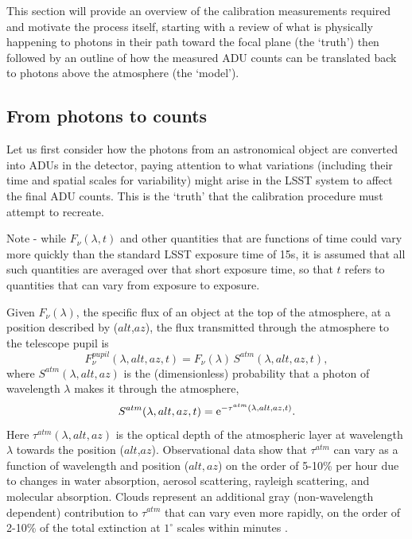 \documentclass[12pt,preprint]{aastex}
\begin{document}
This section will provide an overview of the calibration measurements
required and motivate the process itself, starting with a review of
what is physically happening to photons in their path toward the focal
plane (the `truth') then followed by an outline of how the measured
ADU counts can be translated back to photons above the atmosphere (the
`model').

\subsection{From photons to counts}

Let us first consider how the photons from an astronomical object are
converted into ADUs in the detector, paying attention to what
variations (including their time and spatial scales for variability)
might arise in the LSST system to affect the final ADU counts. This is
the `truth' that the calibration procedure must attempt to recreate. 

Note - while $F_\nu(\lambda,t)$ and other quantities that are functions of time
could vary more quickly than the standard LSST exposure time of 15s, it is
assumed that all such quantities are averaged over that short exposure time, so 
that $t$ refers to quantities that can vary from exposure to exposure. 

Given $F_\nu(\lambda)$, the specific flux of an object at
the top of the atmosphere, at a position described by ($alt$,$az$),
the flux transmitted through the atmosphere to the telescope pupil is
\begin{equation}
\label{eqn:Fpupil}
   F_\nu^{pupil}(\lambda,alt,az,t) = F_\nu(\lambda) \, S^{atm}(\lambda,alt,az,t),
\end{equation}
where $S^{atm}(\lambda,alt,az)$ is the (dimensionless) probability that a photon of 
wavelength $\lambda$ makes it through the atmosphere,
\begin{equation}
\label{eqn:atmTau}
   S^{atm}(\lambda,alt,az,t)   = {\rm e}^{-\tau^{atm}(\lambda,alt,az,t)}.
\end{equation}
Here $\tau^{atm}(\lambda,alt,az)$ is the optical depth of the
atmospheric layer at wavelength $\lambda$ towards the position
($alt$,$az$). Observational data \citep{Stubbs2007b, Burke2010b} show
that $\tau^{atm}$ can vary as a function of wavelength and position
($alt,az$) on the order of 5-10\% per hour due to changes in water
absorption, aerosol scattering, rayleigh scattering, and molecular
absorption. Clouds represent an additional gray (non-wavelength
dependent) contribution to $\tau^{atm}$ that can vary even more
rapidly, on the order of 2-10\% of the total extinction at $1^{\circ}$
scales within minutes \citep{Ivezic2007}.
\end{document}
